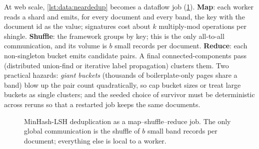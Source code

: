 \begin{systemslens}
At web scale, \cref{lst:data:neardedup} becomes a dataflow job (\cref{fig:data:mapreduce}).
\textbf{Map}: each worker reads a shard and emits, for every document and every band,
the key  with the document id as the value; signatures
cost about $k$ multiply-mod operations per shingle. \textbf{Shuffle}: the framework groups by
key; this is the only all-to-all communication, and its volume is $b$ small records per document.
\textbf{Reduce}: each non-singleton bucket emits candidate pairs. A final connected-components
pass (distributed union-find or iterative label propagation) clusters them. Two practical hazards:
\emph{giant buckets} (thousands of boilerplate-only pages share a band) blow up the pair count
quadratically, so cap bucket sizes or treat large buckets as single clusters; and the
seeded choice of survivor must be deterministic across reruns so that a restarted job keeps the
same documents.
\end{systemslens}

\begin{figure}[t]
\centering
{}
\caption{MinHash-LSH deduplication as a map--shuffle--reduce job. The only global communication
is the shuffle of $b$ small band records per document; everything else is local to a worker.}
\label{fig:data:mapreduce}
\end{figure}

